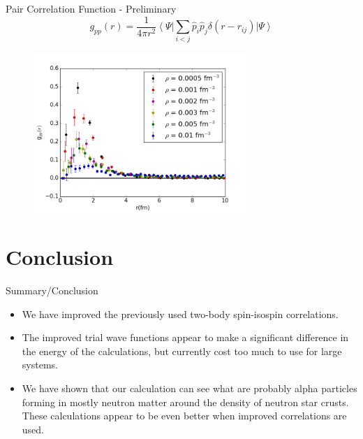 \documentclass{beamer}
\newcommand{\ket}[1]{\left| #1 \right>}
\newcommand{\bra}[1]{\left< #1 \right|}
\begin{document}
\begin{frame}{Pair Correlation Function - Preliminary}
\begin{equation*}
   g_{pp}(r) = \frac{1}{4\pi r^2} \bra{\Psi}\sum\limits_{i<j}\hat{p}_i\hat{p}_j\delta(r-r_{ij})\ket{\Psi}
\end{equation*}
\vspace{-0.4cm}
\begin{figure}[h]
   \centering
   \includegraphics[width=0.72\textwidth]{gpp.png}
\end{figure}
\end{frame}

\section{Conclusion}
\begin{frame}{Summary/Conclusion}
\begin{itemize}
   \item We have improved the previously used two-body spin-isospin correlations.
   \item The improved trial wave functions appear to make a significant difference in the energy of the calculations, but currently cost too much to use for large systems.
   \item We have shown that our calculation can see what are probably alpha particles forming in mostly neutron matter around the density of neutron star crusts. These calculations appear to be even better when improved correlations are used.
\end{itemize}
\end{frame}

\end{document}
